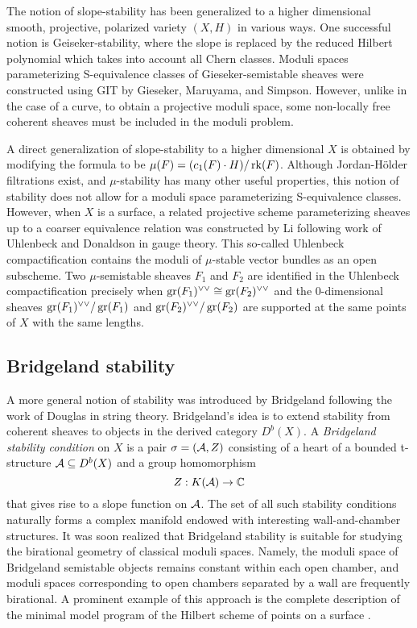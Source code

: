 The notion of slope-stability has been generalized to a higher dimensional smooth, projective, polarized variety $(X, H)$ in various ways. One successful notion is Geiseker-stability, where the slope is replaced by the reduced Hilbert polynomial which takes into account all Chern classes. Moduli spaces parameterizing S-equivalence classes of Gieseker-semistable sheaves were constructed using GIT by Gieseker, Maruyama, and Simpson. However, unlike in the case of a curve, to obtain a projective moduli space, some non-locally free coherent sheaves must be included in the moduli problem.

A direct generalization of slope-stability to a higher dimensional $X$ is obtained by modifying the formula to be $\mu(F) = (c_1(F) \cdot H)/\operatorname{\mathrm{rk}}(F)$. Although Jordan-H\"older filtrations exist, and $\mu$-stability has many other useful properties, this notion of stability does not allow for a moduli space parameterizing S-equivalence classes. However, when $X$ is a surface, a related projective scheme parameterizing sheaves up to a coarser equivalence relation was constructed by Li \cite{li} following work of Uhlenbeck and Donaldson in gauge theory. This so-called Uhlenbeck compactification contains the moduli of $\mu$-stable vector bundles as an open subscheme. Two $\mu$-semistable sheaves $F_1$ and $F_2$ are identified in the Uhlenbeck compactification precisely when $\operatorname{\mathrm{gr}}(F_1)^{\vee\vee} \cong \operatorname{\mathrm{gr}}(F_2)^{\vee\vee}$ and the 0-dimensional sheaves $\operatorname{\mathrm{gr}}(F_1)^{\vee\vee}/\operatorname{\mathrm{gr}}(F_1)$ and $\operatorname{\mathrm{gr}}(F_2)^{\vee\vee}/\operatorname{\mathrm{gr}}(F_2)$ are supported at the same points of $X$ with the same lengths. 

\subsection*{Bridgeland stability}

A more general notion of stability was introduced by Bridgeland \cite{bridgeland} following the work of Douglas in string theory. Bridgeland's idea is to extend stability from coherent sheaves to objects in the derived category $D^b(X)$. A \textit{Bridgeland stability condition} on $X$ is a pair $\sigma = (\mathcal{A}, Z)$ consisting of a heart of a bounded t-structure $\mathcal{A} \subseteq D^b(X)$ and a group homomorphism 
\[ Z: K(\mathcal{A}) \to \mathbb{C} \]
that gives rise to a slope function on $\mathcal{A}$. The set of all such stability conditions naturally forms a complex manifold endowed with interesting wall-and-chamber structures. It was soon realized that Bridgeland stability is suitable for studying the birational geometry of classical moduli spaces. Namely, the moduli space of Bridgeland semistable objects remains constant within each open chamber, and moduli spaces corresponding to open chambers separated by a wall are frequently birational. A prominent example of this approach is the complete description of the minimal model program of the Hilbert scheme of points on a surface \cite{ABCH}.

